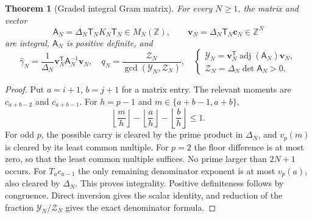 \documentclass[11pt,a4paper]{article}
\newcommand{\Z}{\mathbb Z}
\newtheorem{theorem}{Theorem}[section]
\theoremstyle{definition}
\theoremstyle{remark}
\numberwithin{equation}{section}
\begin{document}
\begin{theorem}[Graded integral Gram matrix]\label{pm:ht:integral}
For every $N\geq1$, the matrix and vector
\[
 \mathsf A_N=\Delta_N\mathsf T_NK_N\mathsf T_N\in M_N(\Z),\qquad
 \boldsymbol v_N=\Delta_N\mathsf T_N\boldsymbol c_N\in\Z^N
\]
are integral, $\mathsf A_N$ is positive definite, and
\begin{equation}\label{pm:ht:primitive}
 \widehat\gamma_N=\frac1{\Delta_N}\boldsymbol v_N^{\mathsf T}\mathsf A_N^{-1}\boldsymbol v_N,
 \quad
 q_N=\frac{\mathcal Z_N}{\gcd(\mathcal Y_N,\mathcal Z_N)},
 \quad
 \begin{cases}
 \mathcal Y_N=\boldsymbol v_N^{\mathsf T}\operatorname{adj}(\mathsf A_N)\boldsymbol v_N,\\
 \mathcal Z_N=\Delta_N\det \mathsf A_N>0.
 \end{cases}
\end{equation}
\end{theorem}
\begin{proof}
Put $a=i+1$, $b=j+1$ for a matrix entry.  The relevant moments are
$c_{a+b-2}$ and $c_{a+b-1}$.  For $h=p-1$ and
$m\in\{a+b-1,a+b\}$,
\[
 \left\lfloor\frac m h\right\rfloor
 -\left\lfloor\frac a h\right\rfloor
 -\left\lfloor\frac b h\right\rfloor\leq1.
\]
For odd $p$, the possible carry is cleared by the prime product in
$\Delta_N$, and $v_p(m)$ is cleared by its least common multiple.
For $p=2$ the floor difference is at most zero, so that the least
common multiple suffices.  No prime larger than $2N+1$ occurs.
For $T_ac_{a-1}$ the only remaining denominator exponent is at most
$v_p(a)$, also cleared by $\Delta_N$.  This proves integrality.
Positive definiteness follows by congruence.  Direct inversion
gives the scalar identity, and reduction of the fraction $\mathcal Y_N/\mathcal Z_N$
gives the exact denominator formula.
\end{proof}
\end{document}
